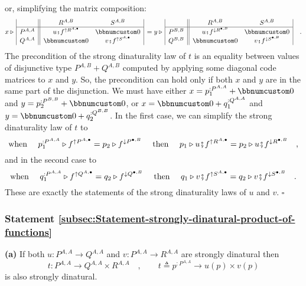 or, simplifying the matrix composition:
\[
x\triangleright\,\begin{array}{|c||cc|}
 & R^{A,B} & S^{A,B}\\
\hline P^{A,A} & u\bef f^{\uparrow R^{A,\bullet}} & \bbnum 0\\
Q^{A,A} & \bbnum 0 & v\bef f^{\uparrow S^{A,\bullet}}
\end{array}\,=y\triangleright\,\begin{array}{|c||cc|}
 & R^{A,B} & S^{A,B}\\
\hline P^{B,B} & u\bef f^{\downarrow R^{\bullet,B}} & \bbnum 0\\
Q^{B,B} & \bbnum 0 & v\bef f^{\downarrow S^{\bullet,B}}
\end{array}\quad.
\]
The precondition of the strong dinaturality law of $t$ is an equality
between values of disjunctive type $P^{A,B}+Q^{A,B}$ computed by
applying some diagonal code matrices to $x$ and $y$. So, the precondition
can hold only if both $x$ and $y$ are in the same part of the disjunction.
We must have either $x=p_{1}^{:P^{A,A}}+\bbnum 0$ and $y=p_{2}^{:P^{B,B}}+\bbnum 0$,
or $x=\bbnum 0+q_{1}^{:Q^{A,A}}$ and $y=\bbnum 0+q_{2}^{:Q^{B,B}}$.
In the first case, we can simplify the strong dinaturality law of
$t$ to
\[
\text{when }\quad p_{1}^{:P^{A,A}}\triangleright f^{\uparrow P^{A,\bullet}}=p_{2}\triangleright f^{\downarrow P^{\bullet,B}}\quad\text{ then }\quad p_{1}\triangleright u\bef f^{\uparrow R^{A,\bullet}}=p_{2}\triangleright u\bef f^{\downarrow R^{\bullet,B}}\quad,
\]
and in the second case to 
\[
\text{when }\quad q_{1}^{:P^{A,A}}\triangleright f^{\uparrow Q^{A,\bullet}}=q_{2}\triangleright f^{\downarrow Q^{\bullet,B}}\quad\text{ then }\quad q_{1}\triangleright v\bef f^{\uparrow S^{A,\bullet}}=q_{2}\triangleright v\bef f^{\downarrow S^{\bullet,B}}\quad.
\]
These are exactly the statements of the strong dinaturality laws of
$u$ and $v$. $\square$

\subsubsection{Statement \label{subsec:Statement-strongly-dinatural-product-of-functions}\ref{subsec:Statement-strongly-dinatural-product-of-functions}}

\textbf{(a)} If both $u:P^{A,A}\rightarrow Q^{A,A}$ and $v:P^{A,A}\rightarrow R^{A,A}$
are strongly dinatural then 
\[
t:P^{A,A}\rightarrow Q^{A,A}\times R^{A,A}\quad,\quad\quad t\triangleq p^{:P^{A,A}}\rightarrow u(p)\times v(p)
\]
is also strongly dinatural. 

